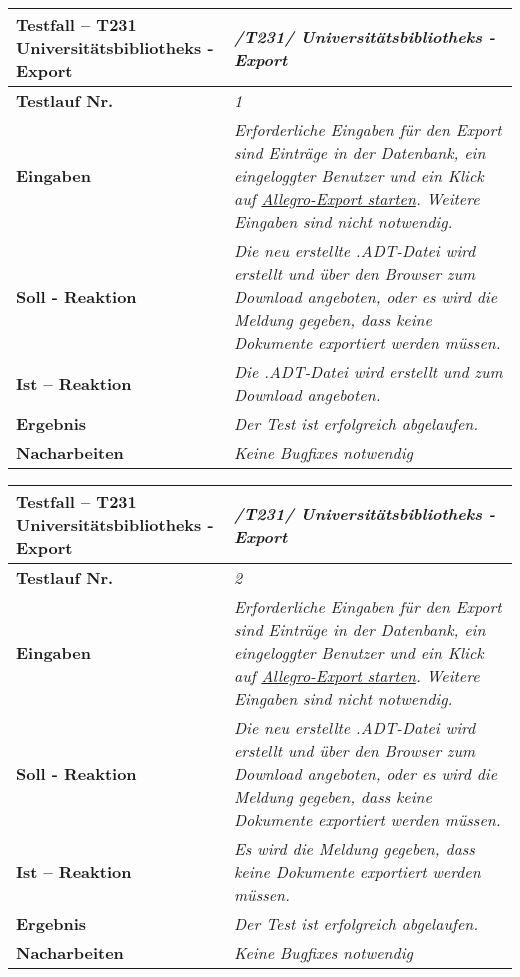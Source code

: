 \begin{longtable}{|p{5cm}|p{10cm}|}
\hline
\textbf{Testfall -- T231 Universitätsbibliotheks - Export} &
\textit{/T231/ Universitätsbibliotheks - Export} \\
\hline 
\textbf{Testlauf Nr.} & \textit{1} \\
\hline
\textbf{Eingaben} & \textit{Erforderliche Eingaben für den Export sind Einträge in der
Datenbank, ein eingeloggter Benutzer und ein Klick auf \uline{Allegro-Export
starten}. Weitere Eingaben sind nicht notwendig. } \\
\hline
\textbf{Soll - Reaktion} & \textit{Die neu erstellte .ADT-Datei wird erstellt
und über den Browser zum Download angeboten, oder es wird die Meldung gegeben,
dass keine Dokumente exportiert werden müssen. } \\
\hline
\textbf{Ist -- Reaktion} & \textit{Die .ADT-Datei wird erstellt und zum
Download angeboten. } \\
\hline
\textbf{Ergebnis} & \textit{Der Test ist erfolgreich abgelaufen. } \\
\hline
\textbf{Nacharbeiten } & \textit{Keine Bugfixes notwendig} \\
\hline
\end{longtable}

\begin{longtable}{|p{5cm}|p{10cm}|}
\hline
\textbf{Testfall -- T231 Universitätsbibliotheks - Export} &
\textit{/T231/ Universitätsbibliotheks - Export} \\
\hline 
\textbf{Testlauf Nr.} & \textit{2} \\
\hline
\textbf{Eingaben} & \textit{Erforderliche Eingaben für den Export sind Einträge in der
Datenbank, ein eingeloggter Benutzer und ein Klick auf \uline{Allegro-Export
starten}. Weitere Eingaben sind nicht notwendig. } \\
\hline
\textbf{Soll - Reaktion} & \textit{Die neu erstellte .ADT-Datei wird erstellt
und über den Browser zum Download angeboten, oder es wird die Meldung gegeben,
dass keine Dokumente exportiert werden müssen. } \\
\hline
\textbf{Ist -- Reaktion} & \textit{Es wird die Meldung gegeben, dass keine
Dokumente exportiert werden müssen. } \\
\hline
\textbf{Ergebnis} & \textit{Der Test ist erfolgreich abgelaufen. } \\
\hline
\textbf{Nacharbeiten } & \textit{Keine Bugfixes notwendig} \\
\hline
\end{longtable}

